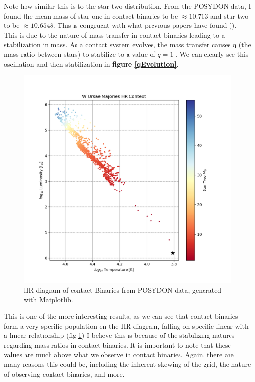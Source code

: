 \documentclass[12pt, a4paper]{article}
\begin{document}
        Note how similar this is to the star two distribution. From the POSYDON data, I found the mean mass of star one in contact binaries to be $\approx 10.703$ and star two to be $\approx 10.6548$. This is congruent with what previous papers have found (\cite{Fabry_2025}). This is due to the nature of mass transfer in contact binaries leading to a stabilization in mass. As a contact system evolves, the mass transfer causes q (the mass ratio between stars) to stabilize to a value of $q=1$ \cite{Fabry_2025}. We can clearly see this oscillation and then stabilization in \textbf{figure \ref{qEvolution}}.

        \begin{figure}[H]
            \centering
            \includegraphics[scale = .6]{figs/GeneratedFigs/W_UMa/WUMaHRDiagram.png}
            \caption{HR diagram of contact Binaries from POSYDON data, generated with Matplotlib.}
            \label{contactBinaryHRDiagram}
        \end{figure}


        This is one of the more interesting results, as we can see that contact binaries form a very specific population on the HR diagram, falling on specific linear with a linear relationship (fig \ref{contactBinaryHRDiagram}) I believe this is because of the stabilizing natures regarding mass ratios in contact binaries. It is important to note that these values are much above what we observe in contact binaries. Again, there are many reasons this could be, including the inherent skewing of the grid, the nature of observing contact binaries, and more. 
\end{document}
